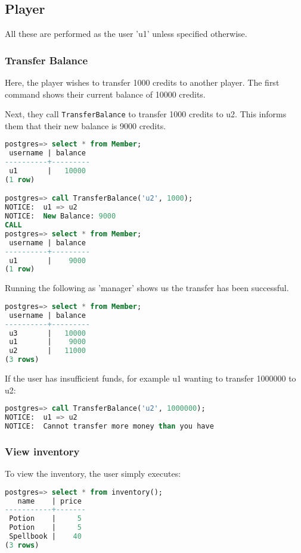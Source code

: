 \subsection{Player}

All these are performed as the user 'u1' unless specified otherwise.


\subsubsection{Transfer Balance}

Here, the player wishes to transfer 1000 credits to another player. The first command shows their current balance of 10000 credits.

Next, they call \verb|TransferBalance| to transfer 1000 credits to u2. This informs them that their new balance is 9000 credits.

\begin{lstlisting}[language=SQL]
postgres=> select * from Member;
 username | balance 
----------+---------
 u1       |   10000
(1 row)

postgres=> call TransferBalance('u2', 1000);
NOTICE:  u1 => u2
NOTICE:  New Balance: 9000
CALL
postgres=> select * from Member;
 username | balance 
----------+---------
 u1       |    9000
(1 row)
\end{lstlisting}

Running the following as 'manager' shows us the transfer has been successful.

\begin{lstlisting}[language=SQL]
postgres=> select * from Member;
 username | balance 
----------+---------
 u3       |   10000
 u1       |    9000
 u2       |   11000
(3 rows)
\end{lstlisting}

If the user has insufficient funds, for example u1 wanting to transfer 1000000 to u2:

\begin{lstlisting}[language=SQL]
postgres=> call TransferBalance('u2', 1000000);
NOTICE:  u1 => u2
NOTICE:  Cannot transfer more money than you have
\end{lstlisting}

\subsubsection{View inventory}

To view the inventory, the user simply executes:

\begin{lstlisting}[language=SQL]
postgres=> select * from inventory();
   name    | price 
-----------+-------
 Potion    |     5
 Potion    |     5
 Spellbook |    40
(3 rows)
\end{lstlisting}

